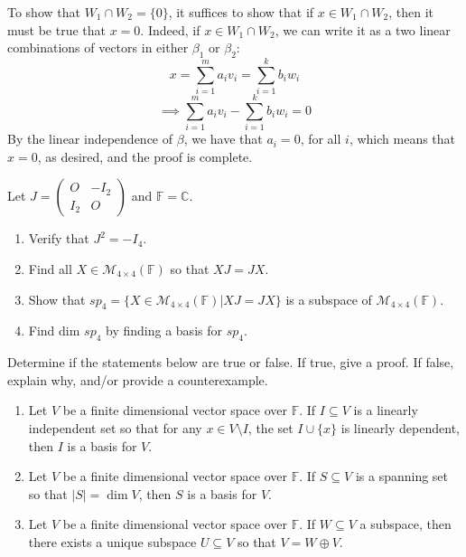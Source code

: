 \documentclass{article}
\theoremstyle{plain} %
\numberwithin{thm}{section} %
\theoremstyle{definition}
\begin{document}
\begin{question}{9}
        To show that \(W_1 \cap W_2 = \{ 0 \}\), it suffices to show that if \(x \in W_1 \cap W_2\), then it must be true that \(x = 0\). Indeed, if \(x \in W_1 \cap W_2\), we can write it as a two linear combinations of vectors in either \(\beta _1\) or \(\beta _2\):
        \[
            x = \sum_{i=1}^{m} a_i v_i = \sum_{i=1}^{k} b_i w_i
        \]
        \[
            \implies \sum_{i=1}^{m} a_i v_i - \sum_{i=1}^{k} b_i w_i = 0
        \]
        By the linear independence of \(\beta\), we have that \(a_i = 0\), for all \(i\), which means that \(x = 0\), as desired, and the proof is complete.
    \end{question}
    \newpage
    \begin{question}{10}
        Let \( J = \left( \begin{array}{c|c} O & -I_2 \\ \hline I_2 & O \end{array} \right) \) and \( \mathbb{F} = \mathbb{C} \).
        
        \begin{enumerate}
            \item Verify that \( J^2 = -I_4 \).
            \item Find all \( X \in \mathcal{M}_{4\times 4}(\mathbb{F}) \) so that \( XJ = JX \).
            \item Show that \( sp_4 = \{ X \in \mathcal{M}_{4\times 4}(\mathbb{F}) | XJ = JX \} \) is a subspace of \( \mathcal{M}_{4\times 4}(\mathbb{F}) \).
            \item Find dim \( sp_4 \) by finding a basis for \( sp_4 \).
        \end{enumerate}
    \end{question}
    \newpage
    \begin{question}{11}
        Determine if the statements below are true or false. If true, give a proof. If false, explain why, and/or provide a counterexample.
        
        \begin{enumerate}[label=(\alph*)]
            \item Let \( V \) be a finite dimensional vector space over \( \mathbb{F} \). If \( I \subseteq V \) is a linearly independent set so that for any \( x \in V \setminus I \), the set \( I \cup \{ x \} \) is linearly dependent, then \( I \) is a basis for \( V \).
            \item Let \( V \) be a finite dimensional vector space over \( \mathbb{F} \). If \( S \subseteq V \) is a spanning set so that \( |S| = \dim V \), then \( S \) is a basis for \( V \).
            \item Let \( V \) be a finite dimensional vector space over \( \mathbb{F} \). If \( W \subseteq V \) a subspace, then there exists a unique subspace \( U \subseteq V \) so that \( V = W \oplus V \).
        \end{enumerate}
    \end{question}
\end{document}
